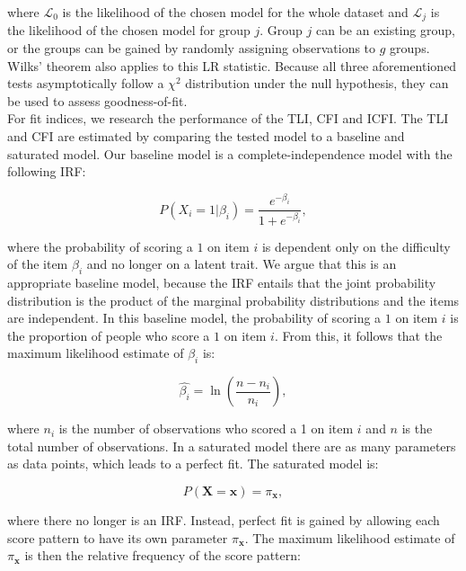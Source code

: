 \documentclass[Royal,sageapa,times,doublespace]{sagej}
\begin{document}
where $\mathcal{L}_0$ is the likelihood of the chosen model for the whole dataset and $\mathcal{L}_j$ is the likelihood of the chosen model for group $j$. Group $j$ can be an existing group, or the groups can be gained by randomly assigning observations to $g$ groups. Wilks' theorem also applies to this LR statistic. Because all three aforementioned tests asymptotically follow a $\chi^2$ distribution under the null hypothesis, they can be used to assess goodness-of-fit. \\
\indent For fit indices, we research the performance of the TLI, CFI and ICFI. The TLI and CFI are estimated by comparing the tested model to a baseline and saturated model. Our baseline model is a complete-independence model with the following IRF:

\begin{equation}
P(X_i = 1 | \beta_{i}) = \frac{e^{- \beta_{i}}}{1 + e^{- \beta_{i}}},
\end{equation}

where the probability of scoring a $1$ on item $i$ is dependent only on the difficulty of the item $\beta_i$ and no longer on a latent trait. We argue that this is an appropriate baseline model, because the IRF entails that the joint probability distribution is the product of the marginal probability distributions and the items are independent. In this baseline model, the probability of scoring a $1$ on item $i$ is the proportion of people who score a $1$ on item $i$. From this, it follows that the maximum likelihood estimate of $\beta_{i}$ is:

\begin{equation*}
\hat{\beta_{i}} = \ln(\frac{n - n_i}{n_i}), 
\end{equation*}

where $n_i$ is the number of observations who scored a 1 on item $i$ and $n$ is the total number of observations. In a saturated model there are as many parameters as data points, which leads to a perfect fit. The saturated model is:

\begin{equation}
P(\boldsymbol{X} = \boldsymbol{x}) = \pi_{\boldsymbol{x}},
\end{equation}

where there no longer is an IRF. Instead, perfect fit is gained by allowing each score pattern to have its own parameter $\pi_{\boldsymbol{x}}$. The maximum likelihood estimate of $\pi_{\boldsymbol{x}}$ is then the relative frequency of the score pattern:
\end{document}
